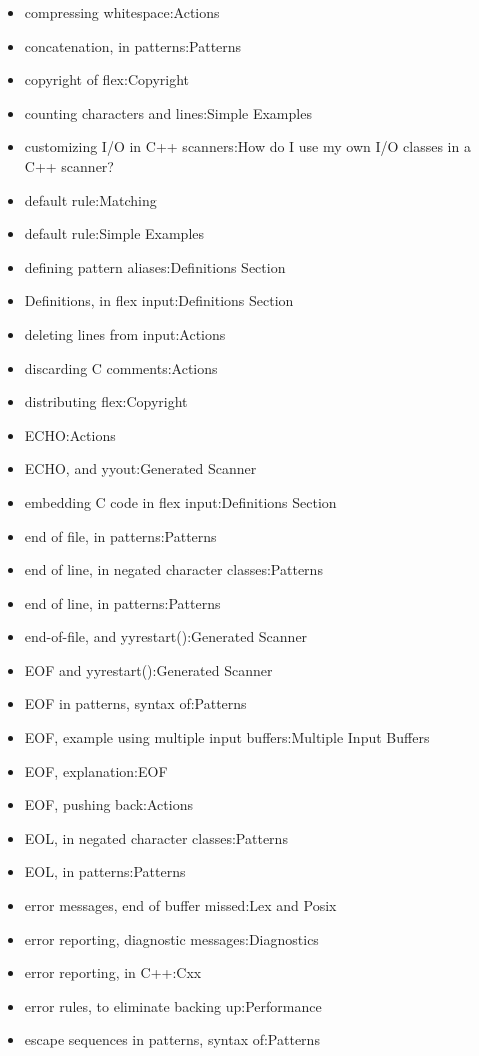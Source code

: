 \documentclass[openany,oneside]{book}
\begin{document}
\begin{itemize}
\item compressing whitespace:Actions
\item concatenation, in patterns:Patterns
\item copyright of flex:Copyright
\item counting characters and lines:Simple Examples
\item customizing I/O in C++ scanners:How do I use my own I/O classes in a C++ scanner?
\item default rule:Matching
\item default rule:Simple Examples
\item defining pattern aliases:Definitions Section
\item Definitions, in flex input:Definitions Section
\item deleting lines from input:Actions
\item discarding C comments:Actions
\item distributing flex:Copyright
\item ECHO:Actions
\item ECHO, and yyout:Generated Scanner
\item embedding C code in flex input:Definitions Section
\item end of file, in patterns:Patterns
\item end of line, in negated character classes:Patterns
\item end of line, in patterns:Patterns
\item end-of-file, and yyrestart():Generated Scanner
\item EOF and yyrestart():Generated Scanner
\item EOF in patterns, syntax of:Patterns
\item EOF, example using multiple input buffers:Multiple Input Buffers
\item EOF, explanation:EOF
\item EOF, pushing back:Actions
\item EOL, in negated character classes:Patterns
\item EOL, in patterns:Patterns
\item error messages, end of buffer missed:Lex and Posix
\item error reporting, diagnostic messages:Diagnostics
\item error reporting, in C++:Cxx
\item error rules, to eliminate backing up:Performance
\item escape sequences in patterns, syntax of:Patterns

\end{itemize}
\end{document}
